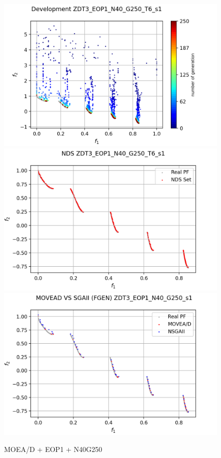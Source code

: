 \begin{minipage}[H]{0.47\linewidth}
\begin{figure}[H]
        \centering
        \includegraphics[scale=0.55]{figures/ZDT3_EOP1_N40_G250_T6/s1_dev.png}\\
        \includegraphics[scale=0.5]{figures/ZDT3_EOP1_N40_G250_T6/s1_nds.png}\\
        \includegraphics[scale=0.5]{figures/ZDT3_EOP1_N40_G250_T6/s1_comp.png}\\
        \caption{MOEA/D + EOP1 + N40G250}
        \label{fig:3}
    \end{figure}
\end{minipage} \hfill
